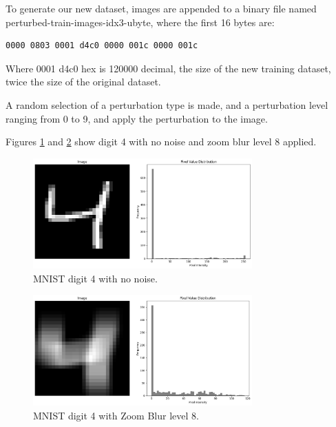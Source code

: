 
To generate our new dataset, images are appended to a binary file named perturbed-train-images-idx3-ubyte, where the first 16 bytes are:
\begin{verbatim}
0000 0803 0001 d4c0 0000 001c 0000 001c    
\end{verbatim}
Where 0001 d4c0 hex is 120000 decimal, the size of the new training dataset, twice the size of the original dataset.

A random selection of a perturbation type is made, and a perturbation level ranging from 0 to 9, and apply the perturbation to the image.

Figures \ref{fig:MNIST_4_clean_with_histogram} and \ref{fig:MNIST_4_noisy_with_histogram} show digit 4 with no noise and zoom blur level 8 applied.
\begin{figure}[h]
    \centering
    \includegraphics[width=0.75\textwidth]{Figures/Methods/MNIST_4_clean_with_histogram.png}
    \caption{MNIST digit 4 with no noise.}
    \label{fig:MNIST_4_clean_with_histogram}
\end{figure}

\begin{figure}[h]
    \centering
    \includegraphics[width=0.75\textwidth]{Figures/Methods/MNIST_4_noisy_with_histogram.png}
    \caption{MNIST digit 4 with Zoom Blur level 8.}
    \label{fig:MNIST_4_noisy_with_histogram}
\end{figure}


